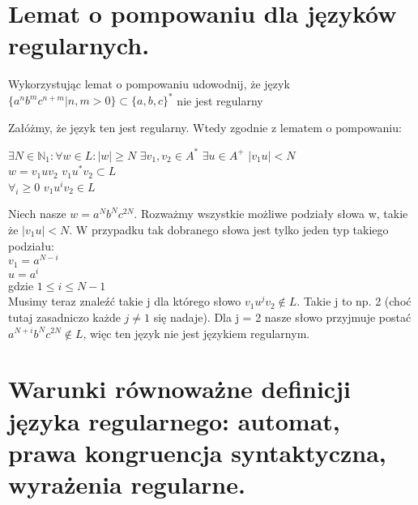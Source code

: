 \documentclass[main.tex]{subfiles}
\begin{document}
    \newpage

    \section{Lemat o pompowaniu dla języków regularnych.}
    \begin{exercise}
        Wykorzystując lemat o pompowaniu udowodnij, że język $\{a^nb^mc^{n+m} | n, m > 0\} \subset \{a, b, c\}^*$ nie jest regularny
    \end{exercise}

    \noindent Załóżmy, że język ten jest regularny. Wtedy zgodnie z lematem o pompowaniu:
    \begin{center}
        $\exists N \in \mathbb{N}_1 : \forall w \in L : |w| \geq N$ $\exists v_1, v_2 \in A^*$ $\exists u \in A^+$ $|v_1u| < N$ \\
        $w = v_1uv_2$   $v_1u^*v_2 \subset L$ \\
        $\forall_i \geq 0$    $v_1u^iv_2 \in L$
    \end{center}

    \noindent Niech nasze $w = a^Nb^Nc^{2N}$. Rozważmy wszystkie możliwe podziały słowa w, takie że $|v_1u| < N$. W przypadku tak dobranego słowa jest tylko jeden typ takiego podziału: \\
    \noindent $v_1 = a^{N-i}$ \\
    \noindent $u = a^i$ \\
    \noindent gdzie $1 \leq i \leq N-1$ \\

    \noindent Musimy teraz znaleźć takie j dla którego słowo $v_1u^jv_2 \notin L$. Takie j to np. 2 (choć tutaj zasadniczo każde $j \neq 1$ się nadaje).
    Dla j = 2 nasze słowo przyjmuje postać $a^{N+i}b^Nc^{2N} \notin L$, więc ten język nie jest językiem regularnym.

    \newpage
    \section{Warunki równoważne definicji języka regularnego: automat, prawa kongruencja syntaktyczna, wyrażenia regularne.}
\end{document}
